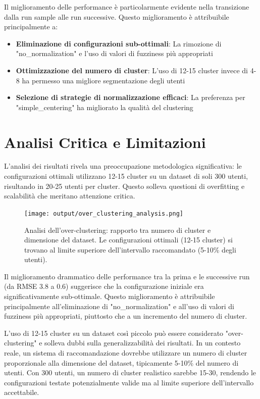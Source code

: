 Il miglioramento delle performance è particolarmente evidente nella transizione dalla run sample alle run successive. Questo miglioramento è attribuibile principalmente a:

\begin{itemize}
    \item \textbf{Eliminazione di configurazioni sub-ottimali}: La rimozione di "no\_normalization" e l'uso di valori di fuzziness più appropriati
    \item \textbf{Ottimizzazione del numero di cluster}: L'uso di 12-15 cluster invece di 4-8 ha permesso una migliore segmentazione degli utenti
    \item \textbf{Selezione di strategie di normalizzazione efficaci}: La preferenza per "simple\_centering" ha migliorato la qualità del clustering
\end{itemize}

\section{Analisi Critica e Limitazioni}

L'analisi dei risultati rivela una preoccupazione metodologica significativa: le configurazioni ottimali utilizzano 12-15 cluster su un dataset di soli 300 utenti, risultando in 20-25 utenti per cluster. Questo solleva questioni di overfitting e scalabilità che meritano attenzione critica.

\begin{figure}[h]
\centering
\texttt{[image: output/over\_clustering\_analysis.png]}
\caption{Analisi dell'over-clustering: rapporto tra numero di cluster e dimensione del dataset. Le configurazioni ottimali (12-15 cluster) si trovano al limite superiore dell'intervallo raccomandato (5-10\% degli utenti).}
\label{fig:over_clustering_analysis}
\end{figure}

Il miglioramento drammatico delle performance tra la prima e le successive run (da RMSE 3.8 a 0.6) suggerisce che la configurazione iniziale era significativamente sub-ottimale. Questo miglioramento è attribuibile principalmente all'eliminazione di "no\_normalization" e all'uso di valori di fuzziness più appropriati, piuttosto che a un incremento del numero di cluster.

L'uso di 12-15 cluster su un dataset così piccolo può essere considerato "over-clustering" e solleva dubbi sulla generalizzabilità dei risultati. In un contesto reale, un sistema di raccomandazione dovrebbe utilizzare un numero di cluster proporzionale alla dimensione del dataset, tipicamente 5-10\% del numero di utenti. Con 300 utenti, un numero di cluster realistico sarebbe 15-30, rendendo le configurazioni testate potenzialmente valide ma al limite superiore dell'intervallo accettabile.


